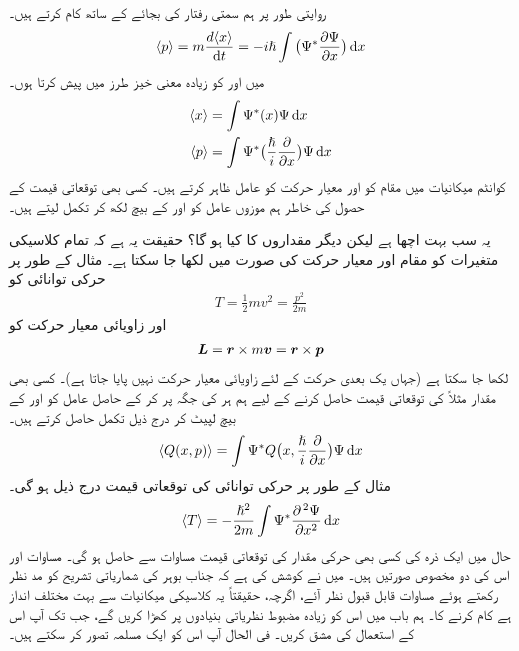 روایتی طور پر ہم سمتی رفتار کی بجائے    کے ساتھ کام کرتے ہیں۔
\begin{align}\label{مساوات_تفاعل_موج_تعریف_معیار_حرکت}
\langle p \rangle=m\frac{d\langle x \rangle}{\dif{t}}=-i\hslash\int\big (\Psi^*\frac{\partial{\Psi}}{\partial{x}} \big)\dif{x}
\end{align}
میں  اور  کو زیادہ معنی خیز طرز میں پیش کرتا ہوں۔
\begin{align}
\langle x \rangle &=\int \Psi^*(x)\Psi \dif{x}\label{مساوات_تفاعل_موج_توقعاتی_مقام}\\
\langle p \rangle&=\int \Psi^*\big (\frac{\hslash}{i}\frac{\partial}{\partial{x}}\big )\Psi \dif{x}\label{مساوات_تفاعل_موج_توقعاتی_معیار_حرکت}
\end{align}
کوانٹم میکانیات میں  مقام کو   اور معیار حرکت کو عامل   ظاہر کرتے ہیں۔  کسی بھی توقعاتی قیمت کے حصول کی خاطر ہم موزوں عامل کو  اور  کے بیچ لکھ کر تکمل لیتے ہیں۔

یہ سب بہت اچھا ہے  لیکن دیگر مقداروں کا کیا ہو گا؟ حقیقت یہ ہے کہ تمام کلاسیکی متغیرات کو مقام اور معیار حرکت کی صورت میں لکھا جا سکتا ہے۔ مثال کے طور پر حرکی توانائی کو
\begin{align*}
T=\frac{1}{2}mv^{2}=\frac{p^{2}}{2m}
\end{align*}
اور زاویائی معیار حرکت کو 
\begin{align*}
{\ensuremath{{\boldsymbol{L}}}}={{\boldsymbol{r}}}\times m{{\boldsymbol{v}}}={{\boldsymbol{r}}}\times {\ensuremath{{\boldsymbol{p}}}}
\end{align*}
لکھا جا سکتا ہے (جہاں یک بعدی حرکت کے لئے  زاویائی معیار حرکت نہیں پایا جاتا ہے)۔ کسی بھی مقدار مثلاً  کی توقعاتی قیمت  حاصل کرنے کے لیے ہم ہر   کی جگہ  پر کر کے حاصل عامل کو  اور  کے بیچ لپیٹ کر درج ذیل تکمل حاصل کرتے ہیں۔
\begin{align}\label{مساوات_تفاعل_موج_توقعاتی_قیمت_حصول}
\langle Q(x,p) \rangle=\int \Psi^*Q\big (x,\frac{\hslash}{i}\frac{\partial}{\partial{x}}\big )\Psi \dif{x}
\end{align}
مثال کے طور پر حرکی توانائی کی توقعاتی قیمت درج ذیل ہو گی۔
\begin{align}
\langle T \rangle=-\frac{\hslash ^{2}}{2m}\int \Psi^*\frac{\partial^{\,2}\Psi}{\partial{x^{2}}}\dif{x}
\end{align}
حال  میں ایک ذرہ کی کسی بھی حرکی مقدار کی توقعاتی قیمت  مساوات   سے حاصل ہو گی۔
مساوات  اور   اس کی دو مخصوص صورتیں ہیں۔ میں نے کوشش کی ہے کہ جناب بوہر کی شماریاتی تشریح کو مد نظر رکھتے ہوئے   مساوات   قابل قبول نظر آئے، اگرچہ، حقیقتاً یہ کلاسیکی میکانیات سے بہت مختلف انداز ہے کام کرنے کا۔ ہم باب   میں اس کو زیادہ مضبوط نظریاتی بنیادوں پر کھڑا کریں گے، جب تک آپ اس کے استعمال  کی مشق کریں۔ فی الحال آپ اس کو ایک مسلمہ تصور کر سکتے ہیں۔

